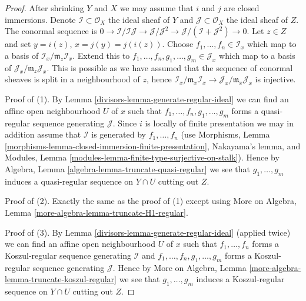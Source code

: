 \begin{proof}

After shrinking $Y$ and $X$ we may assume that $i$ and $j$ are closed
immersions. Denote $\mathcal{I} \subset \mathcal{O}_X$ the ideal sheaf
of $Y$ and $\mathcal{J} \subset \mathcal{O}_X$ the ideal sheaf of $Z$.
The conormal sequence is $0 \to \mathcal{I}/\mathcal{I}\mathcal{J}
\to \mathcal{J}/\mathcal{J}^2 \to
\mathcal{J}/(\mathcal{I} + \mathcal{J}^2) \to 0$.
Let $z \in Z$ and set $y = i(z)$, $x = j(y) = j(i(z))$.
Choose $f_1, \ldots, f_n \in \mathcal{I}_x$ which map to a basis of
$\mathcal{I}_x/\mathfrak m_z\mathcal{I}_x$. Extend this to
$f_1, \ldots, f_n, g_1, \ldots, g_m \in \mathcal{J}_x$
which map to a basis of $\mathcal{J}_x/\mathfrak m_z\mathcal{J}_x$.
This is possible as we have assumed that the sequence of conormal
sheaves is split in a neighbourhood of $z$, hence
$\mathcal{I}_x/\mathfrak m_x\mathcal{I}_x \to
\mathcal{J}_x/\mathfrak m_x\mathcal{J}_x$ is injective.

\medskip\noindent
Proof of (1). By
Lemma \ref{divisors-lemma-generate-regular-ideal}
we can find an affine open neighbourhood $U$ of $x$ such that
$f_1, \ldots, f_n, g_1, \ldots, g_m$ forms a quasi-regular sequence
generating $\mathcal{J}$. Since $i$ is locally of finite presentation
we may in addition assume that $\mathcal{I}$ is generated by
$f_1, \ldots, f_n$ (use
Morphisms, Lemma \ref{morphisms-lemma-closed-immersion-finite-presentation},
Nakayama's lemma, and
Modules, Lemma \ref{modules-lemma-finite-type-surjective-on-stalk}).
Hence by
Algebra, Lemma \ref{algebra-lemma-truncate-quasi-regular}
we see that $g_1, \ldots, g_m$ induces a quasi-regular sequence on
$Y \cap U$ cutting out $Z$.

\medskip\noindent
Proof of (2). Exactly the same as the proof of (1) except using
More on Algebra, Lemma \ref{more-algebra-lemma-truncate-H1-regular}.

\medskip\noindent
Proof of (3). By
Lemma \ref{divisors-lemma-generate-regular-ideal}
(applied twice)
we can find an affine open neighbourhood $U$ of $x$ such that
$f_1, \ldots, f_n$ forms a Koszul-regular sequence generating
$\mathcal{I}$ and $f_1, \ldots, f_n, g_1, \ldots, g_m$ forms a
Koszul-regular sequence generating $\mathcal{J}$. Hence by
More on Algebra, Lemma \ref{more-algebra-lemma-truncate-koszul-regular}
we see that $g_1, \ldots, g_m$ induces a Koszul-regular sequence on
$Y \cap U$ cutting out $Z$.
\end{proof}

